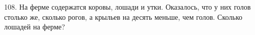 108. На ферме содержатся коровы, лошади и утки. Оказалось, что у них голов столько же, сколько рогов, а крыльев на десять меньше, чем голов. Сколько лошадей на ферме?\\
